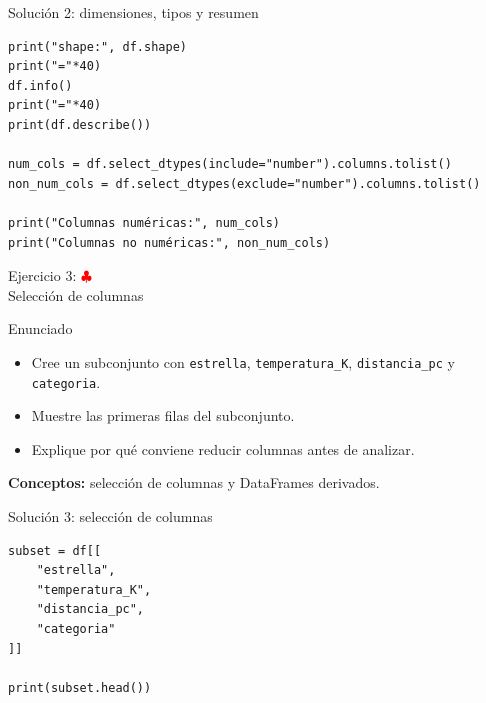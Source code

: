 \documentclass[10pt]{beamer}
\begin{document}
\begin{solutionblock}
\begin{frame}[fragile,shrink=5]{Solución 2: dimensiones, tipos y resumen}
\begin{verbatim}
print("shape:", df.shape)
print("="*40)
df.info()
print("="*40)
print(df.describe())

num_cols = df.select_dtypes(include="number").columns.tolist()
non_num_cols = df.select_dtypes(exclude="number").columns.tolist()

print("Columnas numéricas:", num_cols)
print("Columnas no numéricas:", non_num_cols)
\end{verbatim}
\end{frame}
\end{solutionblock}

\begin{frame}{Ejercicio 3: \hfill \textcolor{red}{$\clubsuit$} \\ Selección de columnas}
  \begin{block}{Enunciado}
    \begin{itemize}
      \item Cree un subconjunto con \texttt{estrella}, \texttt{temperatura\_K}, \texttt{distancia\_pc} y \texttt{categoria}.
      \item Muestre las primeras filas del subconjunto.
      \item Explique por qué conviene reducir columnas antes de analizar.
    \end{itemize}
  \end{block}
  \textbf{Conceptos:} selección de columnas y DataFrames derivados.
\end{frame}

\begin{solutionblock}
\begin{frame}[fragile]{Solución 3: selección de columnas}
\begin{verbatim}
subset = df[[
    "estrella",
    "temperatura_K",
    "distancia_pc",
    "categoria"
]]

print(subset.head())
\end{verbatim}
\end{frame}
\end{solutionblock}
\end{document}
